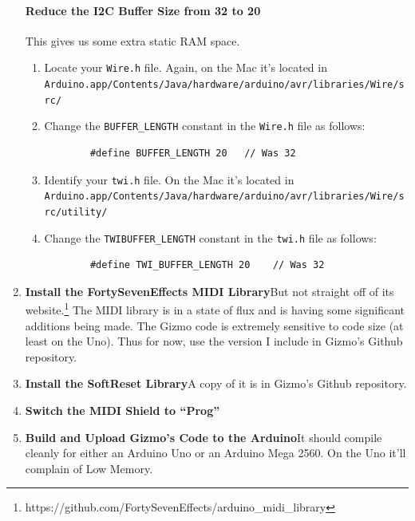 \documentclass{article}
\begin{document}
\begin{enumerate}
\paragraph{Reduce the I2C Buffer Size from 32 to 20} This gives us some extra static RAM space.

\begin{enumerate}
\item Locate your \texttt{Wire.h} file.  Again, on the Mac it's located in\\
\texttt{Arduino.app/Contents/Java/hardware/arduino/avr/libraries/Wire/src/}

\item Change the \texttt{BUFFER\_LENGTH} constant in the \texttt{Wire.h} file as follows:

\begin{verbatim}
        #define BUFFER_LENGTH 20   // Was 32
\end{verbatim}

\item Identify your \texttt{twi.h} file.  On the Mac it's located in\\
\texttt{Arduino.app/Contents/Java/hardware/arduino/avr/libraries/Wire/src/utility/}

\item Change the \texttt{TWIBUFFER\_LENGTH} constant in the \texttt{twi.h} file as follows:

\begin{verbatim}
        #define TWI_BUFFER_LENGTH 20    // Was 32
\end{verbatim}
\end{enumerate}

\item {\bf Install the FortySevenEffects MIDI Library}\quad But not straight off of its website.\footnote{https:/\!/github.com/FortySevenEffects/arduino\_midi\_library}  The MIDI library is in a state of flux and is having some significant additions being made.  The Gizmo code is extremely sensitive to code size (at least on the Uno).  Thus for now, use the version I include in Gizmo's Github repository.

\item {\bf Install the SoftReset Library}\quad A copy of it is in Gizmo's Github repository.

\item {\bf Switch the MIDI Shield to ``Prog''}

\item {\bf Build and Upload Gizmo's Code to the Arduino}\quad  It should compile cleanly for either an Arduino Uno or an Arduino Mega 2560.  On the Uno it'll complain of Low Memory.


\end{enumerate}
\end{document}
